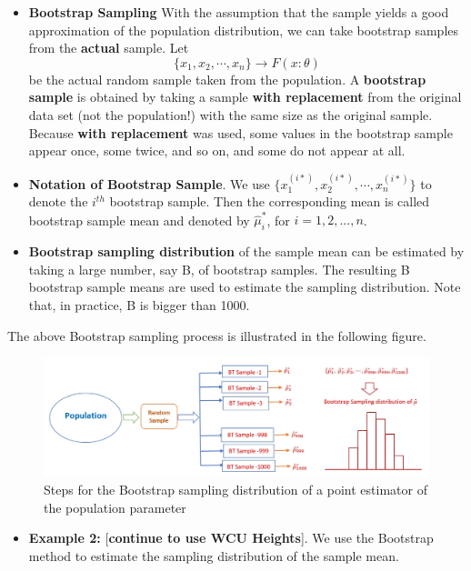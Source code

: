 \documentclass[
]{book}
\providecommand{\tightlist}{%
  \setlength{\itemsep}{0pt}\setlength{\parskip}{0pt}}
\begin{document}
\begin{itemize}
\item
  \textbf{Bootstrap Sampling} With the assumption that the sample yields a good approximation of the population distribution, we can take bootstrap samples from the \textbf{actual} sample. Let
  \[\{x_1, x_2, \cdots, x_n\} \to F(x:\theta)\] be the actual random sample taken from the population. A \textbf{bootstrap sample} is obtained by taking a sample \textbf{with replacement} from the original data set (not the population!) with the same size as the original sample. Because \textbf{with replacement} was used, some values in the bootstrap sample appear once, some twice, and so on, and some do not appear at all.
\item
  \textbf{Notation of Bootstrap Sample}. We use \(\{x_1^{(i*)}, x_2^{(i*)}, \cdots, x_n^{(i*)}\}\) to denote the \(i^{th}\) bootstrap sample. Then the corresponding mean is called bootstrap sample mean and denoted by \(\hat{\mu}_i^*\), for \(i = 1, 2, ..., n\).
\item
  \textbf{Bootstrap sampling distribution} of the sample mean can be estimated by taking a large number, say B, of bootstrap samples. The resulting B bootstrap sample means are used to estimate the sampling distribution. Note that, in practice, B is bigger than 1000.
\end{itemize}

The above Bootstrap sampling process is illustrated in the following figure.

\begin{figure}

{\centering \includegraphics[width=0.8\linewidth]{img05/w05-BootSamplingDist} 

}

\caption{Steps for the Bootstrap sampling distribution of a point estimator of the population parameter}\label{fig:unnamed-chunk-108}
\end{figure}

\begin{itemize}
\tightlist
\item
  \textbf{Example 2:} {[}\textbf{continue to use WCU Heights}{]}. We use the Bootstrap method to estimate the sampling distribution of the sample mean.
\end{itemize}
\end{document}
